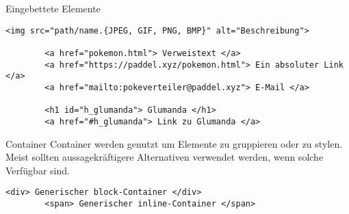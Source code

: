 \begin{bonus}{Eingebettete Elemente}
    \begin{lstlisting}[language=HTML5]
        <img src="path/name.{JPEG, GIF, PNG, BMP}" alt="Beschreibung">
        
        <a href="pokemon.html"> Verweistext </a>
        <a href="https://paddel.xyz/pokemon.html"> Ein absoluter Link </a>
        <a href="mailto:pokeverteiler@paddel.xyz"> E-Mail </a>

        <h1 id="h_glumanda"> Glumanda </h1>
        <a href="#h_glumanda"> Link zu Glumanda </a>
    \end{lstlisting}
\end{bonus}

\begin{bonus}{Container}
    Container werden genutzt um Elemente zu gruppieren oder zu stylen.
    Meist sollten aussagekräftigere Alternativen verwendet werden, wenn solche Verfügbar sind.

    \begin{lstlisting}[language=HTML5]
        <div> Generischer block-Container </div>
        <span> Generischer inline-Container </span>
    \end{lstlisting}
\end{bonus}

